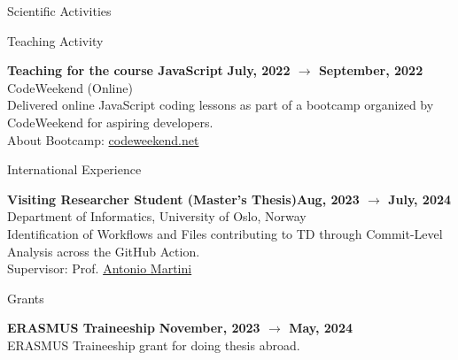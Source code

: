 \documentclass{resume} %
\begin{document}

    \begin{rSection}{Scientific Activities}

        \begin{rSubsection2}{Teaching Activity}

            \item\textbf{ Teaching for the course JavaScript }\hfill \textbf{July, 2022 $\rightarrow$ September, 2022}
            \\CodeWeekend (Online)
            \\Delivered online JavaScript coding lessons as part of a bootcamp organized by CodeWeekend for aspiring developers.
            \\About Bootcamp: \href{https://codeweekend.net/}{codeweekend.net}

        \end{rSubsection2}


        \begin{rSubsection2}{International Experience}

            \item\textbf{ Visiting Researcher Student (Master's Thesis)}\hfill \textbf{Aug, 2023 $\rightarrow$ July, 2024}
            \\Department of Informatics, University of Oslo, Norway
            \\Identification of Workflows and Files contributing to TD through Commit-Level Analysis across the GitHub Action.
            \\Supervisor: Prof. \href{mailto:antonima@ifi.uio.no}{Antonio Martini}

        \end{rSubsection2}

        \begin{rSubsection2}{Grants}
            \item\textbf{ERASMUS Traineeship }\hfill \textbf{November, 2023 $\rightarrow$ May, 2024}
            \\ERASMUS Traineeship grant for doing thesis abroad.
        \end{rSubsection2}

    \end{rSection}
\end{document}
